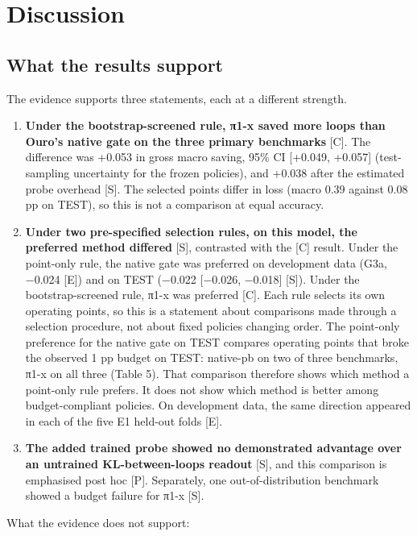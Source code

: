 \section{Discussion}

\subsection{What the results support}

The evidence supports three statements, each at a different strength.

\begin{enumerate}
\def\labelenumi{\arabic{enumi}.}
\tightlist
\item
  \textbf{Under the bootstrap-screened rule, π1-x saved more loops than Ouro's native gate on the three primary benchmarks} {[}C{]}. The difference
  was +0.053 in gross macro saving, 95\% CI {[}+0.049, +0.057{]} (test-sampling uncertainty for the frozen policies), and +0.038 after the estimated probe overhead {[}S{]}. The selected points differ in loss (macro 0.39 against 0.08 pp on TEST), so this is not a comparison at equal accuracy.
\item
  \textbf{Under two pre-specified selection rules, on this model, the preferred method differed} {[}S{]}, contrasted with the {[}C{]} result. Under the point-only rule, the native gate was preferred on development data (G3a, −0.024 {[}E{]})
  and on TEST (−0.022 {[}−0.026, −0.018{]} {[}S{]}). Under the bootstrap-screened rule, π1-x was preferred {[}C{]}. Each rule selects its own
  operating points, so this is a statement about comparisons made through a selection procedure, not about fixed policies changing order.
  The point-only preference for the native gate on TEST compares operating points that broke the observed 1 pp budget on TEST: native-pb on two of
  three benchmarks, π1-x on all three (Table 5). That comparison therefore shows which method a point-only rule prefers. It does not show which method
  is better among budget-compliant policies. On development data, the same direction appeared in each of the five E1 held-out folds {[}E{]}.
\item
  \textbf{The added trained probe showed no demonstrated advantage over an untrained KL-between-loops readout} {[}S{]}, and this comparison is
  emphasised post hoc {[}P{]}. Separately, one out-of-distribution benchmark showed a budget failure for π1-x {[}S{]}.
\end{enumerate}

What the evidence does not support:


